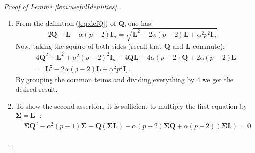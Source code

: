 \documentclass[12pt]{article}
\theoremstyle{plain}
\theoremstyle{remark}
\newcommand{\round}[1]{\left( #1 \right)}
\newcommand{\onen}[0]{{\mathbf{1}_{n}}}
\newcommand{\latMatr}[1]{\mathbf{#1}}          %
\newcommand{\grMatr}[1]{{\boldsymbol{#1}}}   %
\newcommand{\matr}[1]{\mathbf{#1}}          %
\begin{document}
\begin{proof}[Proof of Lemma \ref{lem:usefulIdentities}]
\begin{enumerate}
            \begin{align}
                \label{eq:WJWtop_expr}
                \latMatr W \latMatr{J}_n \latMatr W^\top = \begin{bmatrix}
                    \latMatr U & c \onen
                \end{bmatrix} \begin{bmatrix}
                    \matr 0_{(n-1)\times(n-1)} & \matr 0_{(n-1)\times 1}\\
                    \matr 0_{1 \times (n-1)} & 1
                \end{bmatrix} \begin{bmatrix}
                    \latMatr U^\top \\
                    c \onen^\top
                \end{bmatrix}=  \frac{1}{n} \onen \onen^\top,
            \end{align}
            and this concludes the proof.
            \item From the definition (\ref{eq:defQ}) of $\latMatr Q$, one has:
            \begin{equation*}
                2\latMatr Q - {\latMatr{L}}- \alpha (p-2) \latMatr{I}_n = \sqrt{{\latMatr{L}}^2 - 2\alpha (p-2) {\latMatr{L}}+ \alpha^2 p^2 \latMatr{I}_n}.
            \end{equation*}
            Now, taking the square of both sides (recall that $\latMatr Q$ and $\latMatr L$ commute):
            \begin{align*}
                &4 \latMatr Q^2 + {\latMatr{L}}^2 + \alpha^2 (p-2)^2 \latMatr{I}_n - 4 \latMatr Q{\latMatr{L}}- 4 \alpha (p-2) \latMatr Q + 2 \alpha (p-2) \latMatr L\\
                &= {\latMatr{L}}^2 - 2\alpha (p-2) {\latMatr{L}}+ \alpha^2 p^2 \latMatr{I}_n.
            \end{align*}
            By grouping the common terms and dividing everything by $4$ we get the desired result.
            \item To show the second assertion, it is sufficient to multiply the first equation by ${\grMatr{\Sigma}} = {\latMatr{L}}^-$:
            \begin{align*}
                &{\grMatr{\Sigma}} \latMatr Q^2 - \alpha^2(p-1) {\grMatr{\Sigma}} - \latMatr Q ({\grMatr{\Sigma}} {\latMatr{L}}) - \alpha(p-2) {\grMatr{\Sigma}} \latMatr Q + \alpha (p-2) ({\grMatr{\Sigma}} {\latMatr{L}}) = \matr 0\\

\end{align*}
\end{enumerate}
\end{proof}
\end{document}
